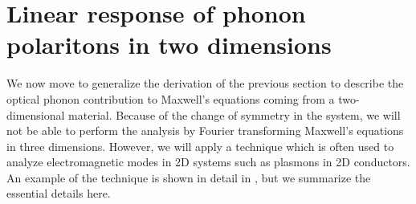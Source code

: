 \documentclass[superscriptaddress,reprint,prb]{revtex4-1}
\begin{document}

\section{Linear response of phonon polaritons in two dimensions}
We now move to generalize the derivation of the previous section to describe the optical phonon contribution to Maxwell's equations coming from a two-dimensional material. Because of the change of symmetry in the system, we will not be able to perform the analysis by Fourier transforming Maxwell's equations in three dimensions. However, we will apply a technique which is often used to analyze electromagnetic modes in 2D systems such as plasmons in 2D conductors. An example of the technique is shown in detail in \cite{jablan2009plasmonics}, but we summarize the essential details here. 
\end{document}
